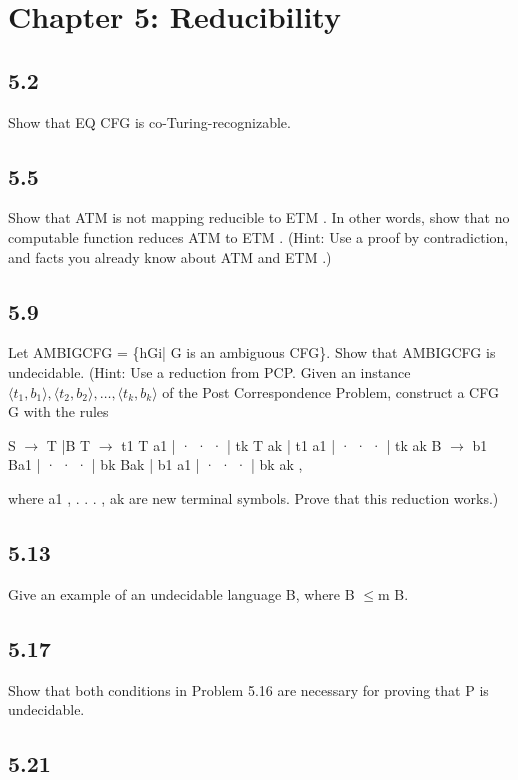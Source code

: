 \section{Chapter 5: Reducibility}

\subsection*{5.2}

Show that EQ CFG is co-Turing-recognizable.


\subsection*{5.5}

Show that ATM is not mapping reducible to ETM . In other words, show that no computable function reduces ATM to ETM . (Hint: Use a proof by contradiction, and facts you already know about ATM and ETM .)


\subsection*{5.9}

Let AMBIGCFG = \{hGi| G is an ambiguous CFG\}. Show that AMBIGCFG is undecidable. (Hint: Use a reduction from PCP. Given an instance $\langle t_1, b_1\rangle, \langle t_2, b_2\rangle, \ldots, \langle t_k, b_k\rangle$ of the Post Correspondence Problem, construct a CFG G with the rules

S $\to$ T |B T $\to$ t1 T a1 | · · · | tk T ak | t1 a1 | · · · | tk ak B $\to$ b1 Ba1 | · · · | bk Bak | b1 a1 | · · · | bk ak ,

where a1 , . . . , ak are new terminal symbols. Prove that this reduction works.)


\subsection*{5.13}

Give an example of an undecidable language B, where B $\le$m B.


\subsection*{5.17}

Show that both conditions in Problem 5.16 are necessary for proving that P is undecidable.


\subsection*{5.21}


